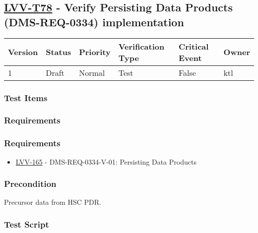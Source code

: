 \hypertarget{lvv-t78---verify-persisting-data-products-dms-req-0334-implementation}{%
\subsection{\texorpdfstring{\href{https://jira.lsstcorp.org/secure/Tests.jspa\#/testCase/LVV-T78}{LVV-T78}
- Verify Persisting Data Products (DMS-REQ-0334)
implementation}{LVV-T78 - Verify Persisting Data Products (DMS-REQ-0334) implementation}}\label{lvv-t78---verify-persisting-data-products-dms-req-0334-implementation}}

\begin{longtable}[]{@{}llllll@{}}
\toprule
Version & Status & Priority & Verification Type & Critical Event &
Owner\tabularnewline
\midrule
\endhead
1 & Draft & Normal & Test & False & ktl\tabularnewline
\bottomrule
\end{longtable}

\hypertarget{test-items-8}{%
\subsubsection{Test Items}\label{test-items-8}}

\hypertarget{requirements-16}{%
\subsubsection{Requirements}\label{requirements-16}}

\hypertarget{requirements-17}{%
\subsubsection{Requirements}\label{requirements-17}}

\begin{itemize}
\tightlist
\item
  \href{https://jira.lsstcorp.org/browse/LVV-165}{LVV-165} -
  DMS-REQ-0334-V-01: Persisting Data Products
\end{itemize}

\hypertarget{precondition-2}{%
\subsubsection{Precondition}\label{precondition-2}}

Precursor data from HSC PDR.

\hypertarget{test-script-8}{%
\subsubsection{Test Script}\label{test-script-8}}

